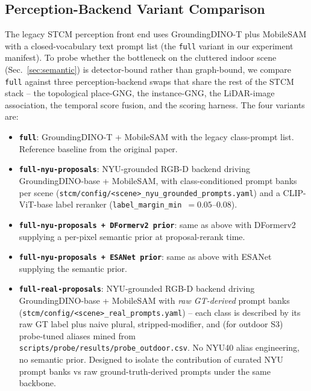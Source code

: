 \subsection{Perception-Backend Variant Comparison}
\label{sec:methods_variant}

The legacy STCM perception front end uses GroundingDINO-T plus
MobileSAM with a closed-vocabulary text prompt list (the
\texttt{full} variant in our experiment manifest). To probe whether
the bottleneck on the cluttered indoor scene (Sec.~\ref{sec:semantic})
is detector-bound rather than graph-bound, we compare \texttt{full}
against three perception-backend swaps that share the rest of the
STCM stack -- the topological place-GNG, the instance-GNG, the
LiDAR-image association, the temporal score fusion, and the scoring
harness. The four variants are:

\begin{itemize}
\item \textbf{\texttt{full}}: GroundingDINO-T + MobileSAM with the
      legacy class-prompt list. Reference baseline from the original
      paper.
\item \textbf{\texttt{full-nyu-proposals}}: NYU-grounded RGB-D
      backend driving GroundingDINO-base + MobileSAM, with
      class-conditioned prompt banks per scene
      (\texttt{stcm/config/<scene>\_nyu\_grounded\_prompts.yaml}) and
      a CLIP-ViT-base label reranker
      (\texttt{label\_margin\_min}~$=0.05$--$0.08$).
\item \textbf{\texttt{full-nyu-proposals + DFormerv2 prior}}: same as
      above with DFormerv2 supplying a per-pixel semantic prior at
      proposal-rerank time.
\item \textbf{\texttt{full-nyu-proposals + ESANet prior}}: same as
      above with ESANet supplying the semantic prior.
\item \textbf{\texttt{full-real-proposals}}: NYU-grounded RGB-D
      backend driving GroundingDINO-base + MobileSAM with
      \emph{raw GT-derived} prompt banks
      (\texttt{stcm/config/<scene>\_real\_prompts.yaml}) -- each
      class is described by its raw GT label plus naive plural,
      stripped-modifier, and (for outdoor S3) probe-tuned aliases
      mined from
      \texttt{scripts/probe/results/probe\_outdoor.csv}. No
      NYU40 alias engineering, no semantic prior. Designed to
      isolate the contribution of curated NYU prompt banks vs raw
      ground-truth-derived prompts under the same backbone.
\end{itemize}


